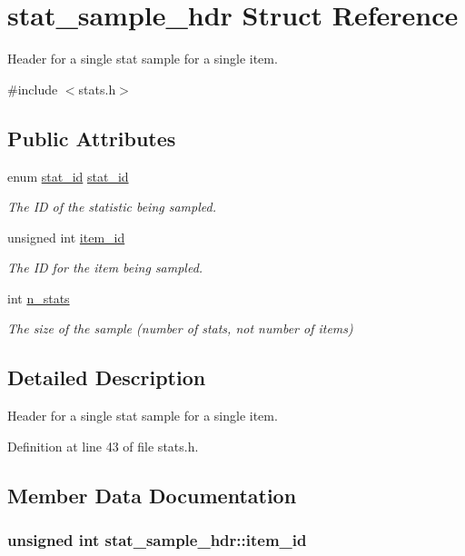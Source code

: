 \hypertarget{structstat__sample__hdr}{\section{stat\-\_\-sample\-\_\-hdr Struct Reference}
\label{structstat__sample__hdr}
}


Header for a single stat sample for a single item.  




{\ttfamily \#include $<$stats.\-h$>$}

\subsection*{Public Attributes}
\begin{DoxyCompactItemize}
\item 
enum \hyperlink{stat__ids_8h_ac210bd14ba53357098c0b3ebdd69784e}{stat\-\_\-id} \hyperlink{structstat__sample__hdr_a742c0f6bbca05f6e9274202df2e6d6a2}{stat\-\_\-id}
\begin{DoxyCompactList}\small\item\em The I\-D of the statistic being sampled. \end{DoxyCompactList}\item 
unsigned int \hyperlink{structstat__sample__hdr_a703445401038b7d18383320e19a0523c}{item\-\_\-id}
\begin{DoxyCompactList}\small\item\em The I\-D for the item being sampled. \end{DoxyCompactList}\item 
int \hyperlink{structstat__sample__hdr_a597d2260ddea06ef785ead436adb277c}{n\-\_\-stats}
\begin{DoxyCompactList}\small\item\em The size of the sample (number of stats, not number of items) \end{DoxyCompactList}\end{DoxyCompactItemize}


\subsection{Detailed Description}
Header for a single stat sample for a single item. 

Definition at line 43 of file stats.\-h.



\subsection{Member Data Documentation}
\hypertarget{structstat__sample__hdr_a703445401038b7d18383320e19a0523c}{
\subsubsection[{item\-\_\-id}]{\setlength{\rightskip}{0pt plus 5cm}unsigned int stat\-\_\-sample\-\_\-hdr\-::item\-\_\-id}}\label{structstat__sample__hdr_a703445401038b7d18383320e19a0523c}


